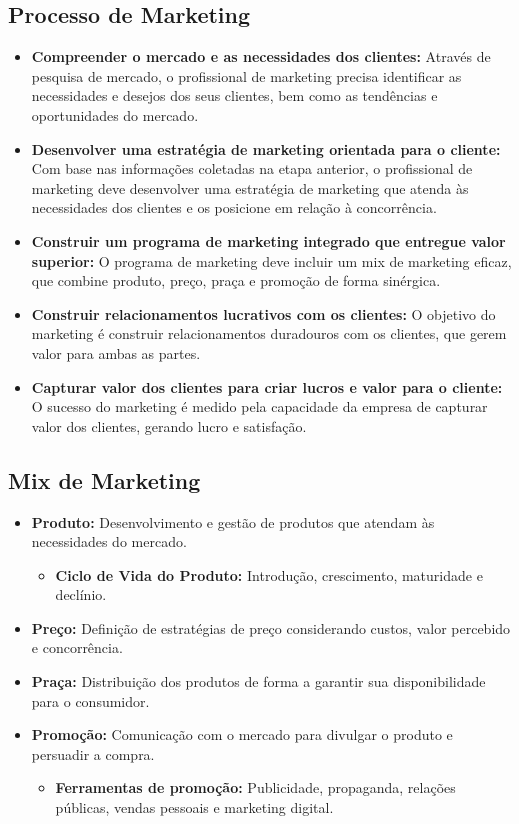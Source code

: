 \documentclass{article}
\begin{document}
\subsection{Processo de Marketing}
\begin{itemize}
    \item \textbf{Compreender o mercado e as necessidades dos clientes:} Através de pesquisa de mercado, o profissional de marketing precisa identificar as necessidades e desejos dos seus clientes, bem como as tendências e oportunidades do mercado.
    \item \textbf{Desenvolver uma estratégia de marketing orientada para o cliente:} Com base nas informações coletadas na etapa anterior, o profissional de marketing deve desenvolver uma estratégia de marketing que atenda às necessidades dos clientes e os posicione em relação à concorrência.
    \item \textbf{Construir um programa de marketing integrado que entregue valor superior:} O programa de marketing deve incluir um mix de marketing eficaz, que combine produto, preço, praça e promoção de forma sinérgica.
    \item \textbf{Construir relacionamentos lucrativos com os clientes:} O objetivo do marketing é construir relacionamentos duradouros com os clientes, que gerem valor para ambas as partes.
    \item \textbf{Capturar valor dos clientes para criar lucros e valor para o cliente:} O sucesso do marketing é medido pela capacidade da empresa de capturar valor dos clientes, gerando lucro e satisfação.
\end{itemize}

\subsection{Mix de Marketing}
\begin{itemize}
    \item \textbf{Produto:} Desenvolvimento e gestão de produtos que atendam às necessidades do mercado. 
    \begin{itemize}
        \item \textbf{Ciclo de Vida do Produto:} Introdução, crescimento, maturidade e declínio. 
    \end{itemize}
    \item \textbf{Preço:} Definição de estratégias de preço considerando custos, valor percebido e concorrência. 
    \item \textbf{Praça:} Distribuição dos produtos de forma a garantir sua disponibilidade para o consumidor. 
    \item \textbf{Promoção:} Comunicação com o mercado para divulgar o produto e persuadir a compra. 
    \begin{itemize}
        \item \textbf{Ferramentas de promoção:} Publicidade, propaganda, relações públicas, vendas pessoais e marketing digital. 
    \end{itemize}
\end{itemize}
\end{document}
